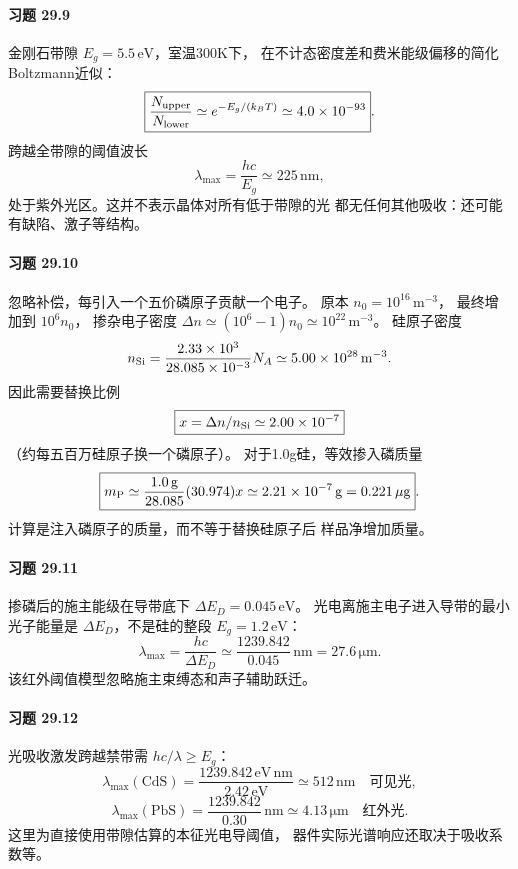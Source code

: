 \paragraph{习题 29.9}
金刚石带隙
\(E_g=5.5\,\mathrm{eV}\)，室温300K下，
在不计态密度差和费米能级偏移的简化Boltzmann近似：
\[
\boxed{\frac{N_{\rm upper}}{N_{\rm lower}}
\simeq e^{-E_g/(k_BT)}
\simeq4.0\times10^{-93}}.
\]
跨越全带隙的阈值波长
\[
\boxed{\lambda_{\max}=\frac{hc}{E_g}
\simeq225\,\mathrm{nm}},
\]
处于紫外光区。这并不表示晶体对所有低于带隙的光
都无任何其他吸收：还可能有缺陷、激子等结构。

\paragraph{习题 29.10}
忽略补偿，每引入一个五价磷原子贡献一个电子。
原本 \(n_0=10^{16}\,\mathrm{m^{-3}}\)，
最终增加到 \(10^6n_0\)，
掺杂电子密度
\(\Delta n\simeq(10^6-1)n_0\simeq10^{22}\,\mathrm{m^{-3}}\)。
硅原子密度
\[
n_{\rm Si}=\frac{2.33\times10^3}
{28.085\times10^{-3}}N_A
\simeq5.00\times10^{28}\,\mathrm{m^{-3}}.
\]
因此需要替换比例
\[
\boxed{x=\Delta n/n_{\rm Si}\simeq2.00\times10^{-7}}
\]
（约每五百万硅原子换一个磷原子）。
对于1.0g硅，等效掺入磷质量
\[
\boxed{m_{\rm P}
\simeq\frac{1.0\,\mathrm g}{28.085}
(30.974)x\simeq2.21\times10^{-7}\,\mathrm g
=0.221\,\mathrm{\mu g}}.
\]
计算是注入磷原子的质量，而不等于替换硅原子后
样品净增加质量。

\paragraph{习题 29.11}
掺磷后的施主能级在导带底下
\(\Delta E_D=0.045\,\mathrm{eV}\)。
光电离施主电子进入导带的最小光子能量是
\(\Delta E_D\)，不是硅的整段
\(E_g=1.2\,\mathrm{eV}\)：
\[
\boxed{\lambda_{\max}=\frac{hc}{\Delta E_D}
\simeq\frac{1239.842}{0.045}\,\mathrm{nm}
=27.6\,\mathrm{\mu m}}.
\]
该红外阈值模型忽略施主束缚态和声子辅助跃迁。

\paragraph{习题 29.12}
光吸收激发跨越禁带需
\(hc/\lambda\ge E_g\)：
\[
\boxed{\lambda_{\max}(\mathrm{CdS})
=\frac{1239.842\,\mathrm{eV\,nm}}{2.42\,\mathrm{eV}}
\simeq512\,\mathrm{nm}\quad\text{可见光}},
\]
\[
\boxed{\lambda_{\max}(\mathrm{PbS})
=\frac{1239.842}{0.30}\,\mathrm{nm}
\simeq4.13\,\mathrm{\mu m}\quad\text{红外光}}.
\]
这里为直接使用带隙估算的本征光电导阈值，
器件实际光谱响应还取决于吸收系数等。

